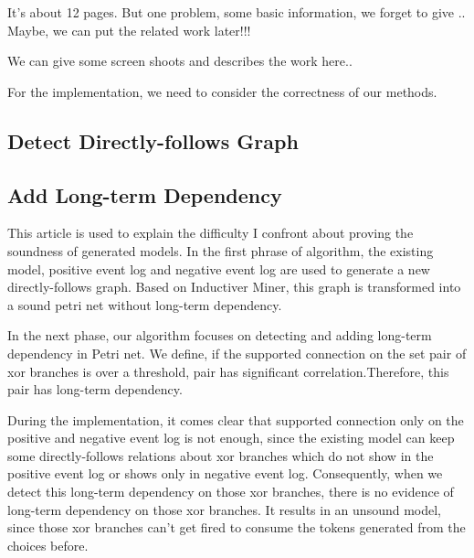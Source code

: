 It's about 12 pages. But one problem, some basic information, we forget to give .. Maybe, we can put the related work later!!!


We can give some screen shoots and describes the work here..

For the implementation, we need to consider the correctness of our methods.
\subsection{Detect Directly-follows Graph}


\subsection{Add Long-term Dependency}
This article is used to explain the difficulty I confront about proving the soundness of generated models.
In the first phrase of algorithm, the existing model, positive event log and negative event log are used to generate a new directly-follows graph. Based on Inductiver Miner, this graph is transformed into a sound petri net without long-term dependency. 

In the next phase, our algorithm focuses on detecting and adding long-term dependency in Petri net. We define, if the supported connection on the set pair of xor branches is over a threshold, pair has significant correlation.Therefore, this pair has long-term dependency.

During the implementation, it comes clear that supported connection only on the positive and negative event log is not enough, since the existing model can keep some directly-follows relations about xor branches which do not show in the positive event log or shows only in negative event log. Consequently, when we detect this long-term dependency on those xor branches, there is no evidence of long-term dependency on those xor branches. It results in an unsound model, since those xor branches can't get fired to consume the tokens generated from the choices before.

